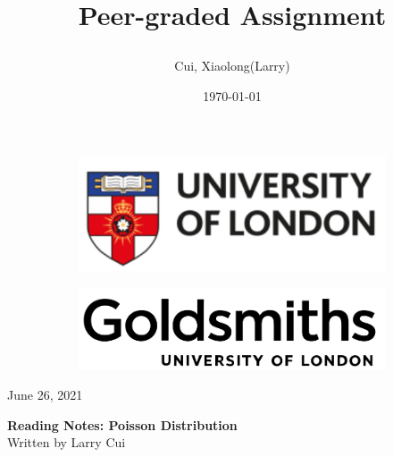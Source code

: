 \documentclass[12pt]{article}
\title{\vspace{-90pt} 



\textbf  {Peer-graded Assignment} }
\author{Cui, Xiaolong(Larry)}
\date{\today}
\begin{document}

\thispagestyle{plain}


\begin{figure}[H] %
  \begin{subfigure}{0.3\textwidth}
    \includegraphics[width=\textwidth]{uol}
  \end{subfigure}
  \hfill
  \begin{subfigure}{0.3\textwidth}
    \includegraphics[width=\textwidth]{goldsmiths}
  \end{subfigure}
\end{figure}


\begin{flushright}

\footnotesize {June 26, 2021}
\end{flushright}

\begin{center}
\textbf{Reading Notes: Poisson Distribution} \\
\footnotesize {Written by Larry Cui}
\end{center}

\end{document}
